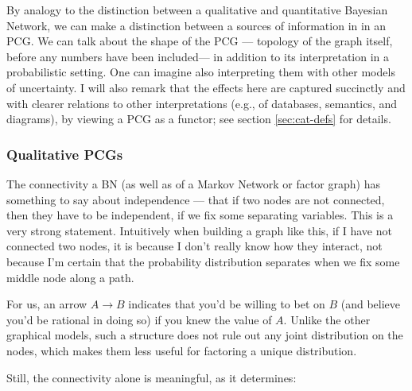 \documentclass{article}
\begin{document}
	By analogy to the distinction between a qualitative and quantitative Bayesian Network, 	
	we can make a distinction between a sources of information in in an PCG. We can talk about the shape of the PCG --- topology of the graph itself, before any numbers have been included--- in addition to its interpretation in a probabilistic setting. One can imagine also interpreting them with other models of uncertainty.  I will also remark that the effects here are captured succinctly and with clearer relations to other interpretations (e.g., of databases, semantics, and diagrams), by viewing a PCG as a functor; see section \ref{sec:cat-defs} for details. 
	
	\subsubsection{Qualitative PCGs} The connectivity a BN (as well as of a Markov Network or factor graph) has something to say about independence --- that if two nodes are not connected, then they have to be independent, if we fix some separating variables. This is a very strong statement. Intuitively when building a graph like this, if I have not connected two nodes, it is because I don't really know how they interact, not because I'm certain that the probability distribution separates when we fix some middle node along a path.
	
	For us, an arrow $A \to B$ indicates that you'd be willing to bet on $B$ (and believe you'd be rational in doing so) if you knew the value of $A$. Unlike the other graphical models, such a structure does not rule out any joint distribution on the nodes, which makes them less useful for factoring a unique distribution. 
	
	Still, the connectivity alone is meaningful, as it determines:	
	
\end{document}
